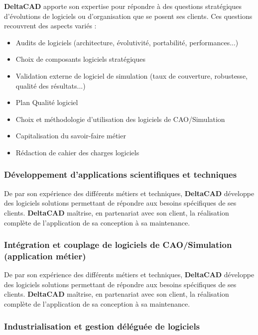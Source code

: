 \textbf{DeltaCAD} apporte son expertise pour répondre à des questions stratégiques d'évolutions de logiciels ou d'organisation que se posent ses clients. Ces questions recouvrent des aspects variés : \\
\begin{itemize}
  \item Audits de logiciels (architecture, évolutivité, portabilité, performances...)
  \item Choix de composants logiciels stratégiques
  \item Validation externe de logiciel de simulation (taux de couverture, robustesse, qualité des résultats...)
  \item Plan Qualité logiciel
  \item Choix et méthodologie d'utilisation des logiciels de CAO/Simulation
  \item Capitalisation du savoir-faire métier
  \item Rédaction de cahier des charges logiciels
\end{itemize}

\subsubsection{Développement d'applications scientifiques et techniques}

De par son expérience des différents métiers et techniques, \textbf{DeltaCAD} développe des logiciels solutions permettant de répondre aux besoins spécifiques de ses clients. \textbf{DeltaCAD} maîtrise, en partenariat avec son client, la réalisation complète de l'application de sa conception à sa maintenance.\\

\subsubsection{Intégration et couplage de logiciels de CAO/Simulation (application métier)}

De par son expérience des différents métiers et techniques, \textbf{DeltaCAD} développe des logiciels solutions permettant de répondre aux besoins spécifiques de ses clients. \textbf{DeltaCAD} maîtrise, en partenariat avec son client, la réalisation complète de l'application de sa conception à sa maintenance.\\

\clearpage
\subsubsection{Industrialisation et gestion déléguée de logiciels}

